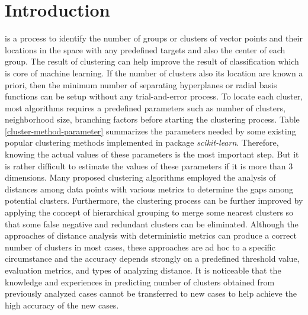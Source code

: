 \documentclass[lettersize,journal]{IEEEtran}
\begin{document}
\section{Introduction}
 is a process to identify the number of groups or clusters of vector points 
and their locations in the space with any predefined targets and also the center of each group. 
The result of clustering can help improve 
the result of classification which is core of machine learning. If the number of clusters also its 
location are known a priori, then the minimum number of separating hyperplanes or radial basis functions 
can be setup without any trial-and-error process. To locate each cluster, most algorithms requires
a predefined parameters such as number of clusters, neighborhood size, branching factors before starting 
the clustering process. Table \ref{cluster-method-parameter} summarizes the parameters needed by some 
existing popular clustering methods implemented in package {\em scikit-learn}.  Therefore, knowing the 
actual values of these parameters is the most important step. But it is rather difficult to estimate the 
values of these parameters if it is more than 3 dimensions. Many proposed clustering algorithms 
employed the analysis of distances among data points with various metrics to determine the gaps among
potential clusters. Furthermore, the clustering process can be further improved by applying the concept of 
hierarchical grouping to merge some nearest clusters so that some false negative and redundant clusters 
can be eliminated. Although the approaches of distance analysis with deterministic metrics can produce a 
correct number of clusters in most cases, these approaches are ad hoc to a specific circumstance
and the accuracy depends strongly on a predefined threshold value,
evaluation metrics, and types of analyzing distance. It is noticeable that the knowledge and experiences
in predicting number of clusters obtained from previously analyzed cases cannot be transferred to new 
cases to help achieve the high accuracy of the new cases.
\end{document}
